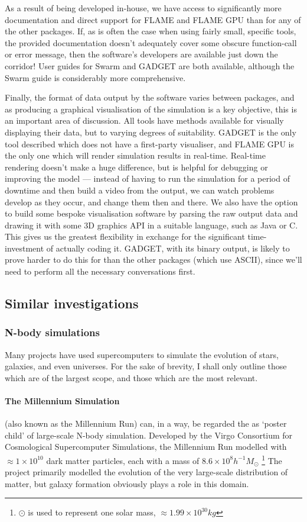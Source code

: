 \documentclass[11pt,a4paper]{article}
\begin{document}
As a result of being developed in-house, we have access to significantly more documentation and direct support for FLAME and FLAME GPU than for any of the other packages. If, as is often the case when using fairly small, specific tools, the provided documentation doesn't adequately cover some obscure function-call or error message, then the software's developers are available just down the corridor! User guides for Swarm and GADGET are both available, although the Swarm guide is considerably more comprehensive.

Finally, the format of data output by the software varies between packages, and as producing a graphical visualisation of the simulation is a key objective, this is an important area of discussion. All tools have methods available for visually displaying their data, but to varying degrees of suitability. GADGET is the only tool described which does not have a first-party visualiser, and FLAME GPU is the only one which will render simulation results in real-time. Real-time rendering doesn't make a huge difference, but is helpful for debugging or improving the model --- instead of having to run the simulation for a period of downtime and then build a video from the output, we can watch problems develop as they occur, and change them then and there. We also have the option to build some bespoke visualisation software by parsing the raw output data and drawing it with some 3D graphics API in a suitable language, such as Java or C. This gives us the greatest flexibility in exchange for the significant time-investment of actually coding it. GADGET, with its binary output, is likely to prove harder to do this for than the other packages (which use ASCII), since we'll need to perform all the necessary conversations first.

\subsection{Similar investigations}
\label{similarStudies}
\subsubsection{N-body simulations}
Many projects have used supercomputers to simulate the evolution of stars, galaxies, and even universes. For the sake of brevity, I shall only outline those which are of the largest scope, and those which are the most relevant.

\paragraph{The Millennium Simulation} \label{MilSim} \cite{millenium} (also known as the Millennium Run) can, in a way, be regarded the as `poster child' of large-scale N-body simulation. Developed by the Virgo Consortium for Cosmological Supercomputer Simulations, the Millennium Run modelled with $\approx 1\times10^{10}$ dark matter particles, each with a mass of $8.6\times10^8h^{-1}M_\odot$ \footnote{$\odot$ is used to represent one solar mass, $\approx1.99\times10^{30}kg$} The project primarily modelled the evolution of the very large-scale distribution of matter, but galaxy formation obviously plays a role in this domain. 
\end{document}
